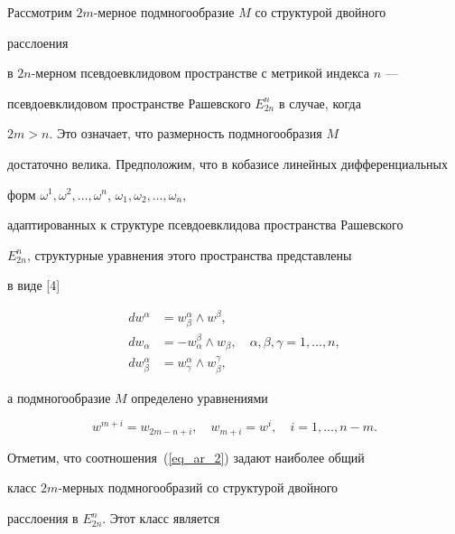 Рассмотрим $2m$-мерное подмногообразие $M$ со структурой двойного


расслоения


в $2n$-мерном псевдоевклидовом пространстве с метрикой индекса $n$ ---


псевдоевклидовом пространстве Рашевского $E^n_{2n}$ в случае, когда


$2m>n$. Это означает, что размерность подмногообразия $M$


достаточно велика. Предположим, что в кобазисе линейных дифференциальных


форм $\omega^1,\omega^2,\dotsc,\omega^n$, $\omega_1,\omega_2,\dotsc,


\omega_n$,


адаптированных к структуре псевдоевклидова пространства Рашевского


$E^n_{2n}$, структурные уравнения этого пространства представлены


в виде [4]


\begin{equation}


\label{eq_ar_1}


\begin{split}


dw^{\alpha}&=w^{\alpha}_{\beta}\wedge w^{\beta},\\


dw_{\alpha}&=-w^{\beta}_{\alpha}\wedge w_{\beta},\quad \alpha, \beta,


\gamma =1, \dotsc, n,\\


dw^{\alpha}_{\beta}&=w^{\alpha}_{\gamma}\wedge w^{\gamma}_{\beta},


\end{split}


\end{equation}


а подмногообразие $M$ определено уравнениями


\begin{equation}


\label{eq_ar_2}


w^{m+i}=w_{2m-n+i},\quad w_{m+i}=w^i,\quad i=1, \dotsc, n-m.


\end{equation}


Отметим, что соотношения~(\ref{eq_ar_2}) задают наиболее общий


класс $2m$-мерных подмногообразий со структурой двойного


расслоения в $E^n_{2n}$. Этот класс является



